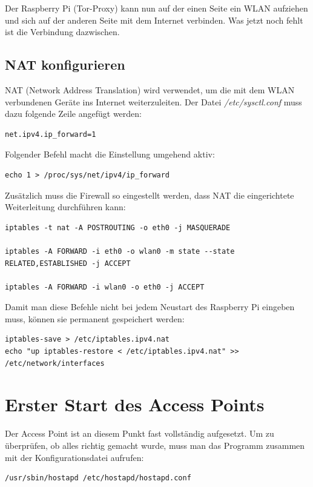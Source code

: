 Der Raspberry Pi (Tor-Proxy) kann nun auf der einen Seite ein WLAN aufziehen und sich auf der anderen Seite mit dem Internet verbinden. Was jetzt noch fehlt ist die Verbindung dazwischen.

\subsection{NAT konfigurieren}
NAT (Network Address Translation) wird verwendet, um die mit dem WLAN verbundenen Geräte ins Internet weiterzuleiten. Der Datei \textit{/etc/sysctl.conf} muss dazu folgende Zeile angefügt werden:

\begin{lstlisting}
net.ipv4.ip_forward=1
\end{lstlisting}

Folgender Befehl macht die Einstellung umgehend aktiv:

\begin{lstlisting}
echo 1 > /proc/sys/net/ipv4/ip_forward
\end{lstlisting}

Zusätzlich muss die Firewall so eingestellt werden, dass NAT die eingerichtete Weiterleitung durchführen kann:

\begin{lstlisting}
iptables -t nat -A POSTROUTING -o eth0 -j MASQUERADE

iptables -A FORWARD -i eth0 -o wlan0 -m state --state RELATED,ESTABLISHED -j ACCEPT

iptables -A FORWARD -i wlan0 -o eth0 -j ACCEPT
\end{lstlisting}

Damit man diese Befehle nicht bei jedem Neustart des Raspberry Pi eingeben muss, können sie permanent gespeichert werden:

\begin{lstlisting}
iptables-save > /etc/iptables.ipv4.nat
echo "up iptables-restore < /etc/iptables.ipv4.nat" >> /etc/network/interfaces
\end{lstlisting}

\section{Erster Start des Access Points}
Der Access Point ist an diesem Punkt fast vollständig aufgesetzt. Um zu überprüfen, ob alles richtig gemacht wurde, muss man das Programm zusammen mit der Konfigurationsdatei aufrufen:
\begin{lstlisting}
/usr/sbin/hostapd /etc/hostapd/hostapd.conf
\end{lstlisting}

